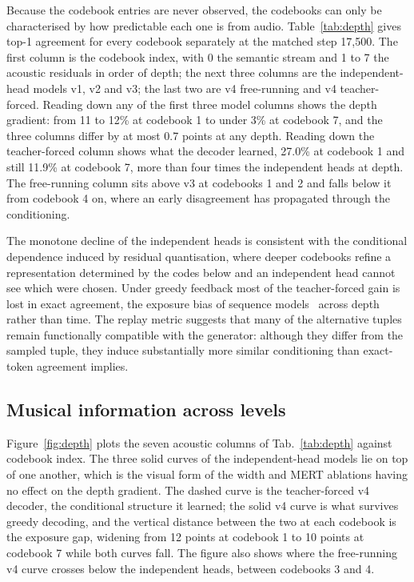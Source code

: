 Because the codebook entries are never observed, the codebooks can only be characterised by how predictable each one is from audio. Table~\ref{tab:depth} gives top-1 agreement for every codebook separately at the matched step 17,500. The first column is the codebook index, with 0 the semantic stream and 1 to 7 the acoustic residuals in order of depth; the next three columns are the independent-head models v1, v2 and v3; the last two are v4 free-running and v4 teacher-forced. Reading down any of the first three model columns shows the depth gradient: from 11 to 12\% at codebook 1 to under 3\% at codebook 7, and the three columns differ by at most 0.7 points at any depth. Reading down the teacher-forced column shows what the decoder learned, 27.0\% at codebook 1 and still 11.9\% at codebook 7, more than four times the independent heads at depth. The free-running column sits above v3 at codebooks 1 and 2 and falls below it from codebook 4 on, where an early disagreement has propagated through the conditioning.



The monotone decline of the independent heads is consistent with the conditional dependence induced by residual quantisation, where deeper codebooks refine a representation determined by the codes below and an independent head cannot see which were chosen. Under greedy feedback most of the teacher-forced gain is lost in exact agreement, the exposure bias of sequence models~\cite{bengio2015scheduled,ranzato2016sequence} across depth rather than time. The replay metric suggests that many of the alternative tuples remain functionally compatible with the generator: although they differ from the sampled tuple, they induce substantially more similar conditioning than exact-token agreement implies.

\subsection{Musical information across levels}

Figure~\ref{fig:depth} plots the seven acoustic columns of Tab.~\ref{tab:depth} against codebook index. The three solid curves of the independent-head models lie on top of one another, which is the visual form of the width and MERT ablations having no effect on the depth gradient. The dashed curve is the teacher-forced v4 decoder, the conditional structure it learned; the solid v4 curve is what survives greedy decoding, and the vertical distance between the two at each codebook is the exposure gap, widening from 12 points at codebook 1 to 10 points at codebook 7 while both curves fall. The figure also shows where the free-running v4 curve crosses below the independent heads, between codebooks 3 and 4.

